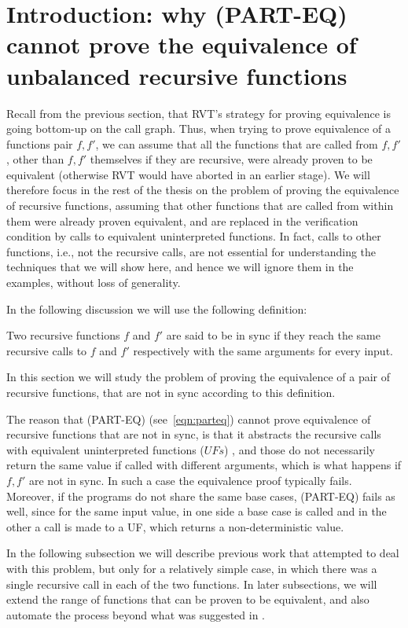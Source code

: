 \newcommand\os[1]{\textcolor{blue}{[os: #1]}}
\newcommand\crjs[1]{\textcolor{purple}{[CRJS: #1]}}
\section{Introduction: why (PART-EQ) cannot prove the equivalence of unbalanced recursive functions}
Recall from the previous section, that RVT's strategy for proving equivalence is going bottom-up on the call graph. Thus, when trying to prove equivalence of a functions pair $f,f'$, we can assume that all the functions that are called from $f,f'$, other than $f,f'$ themselves if they are recursive, were already proven to be equivalent (otherwise RVT would have aborted in an earlier stage). We will therefore focus in the rest of the thesis on the problem of proving the equivalence of recursive functions, assuming that other functions that are called from within them were already proven equivalent, and are replaced in the verification condition by calls to equivalent uninterpreted functions. In fact, calls to other functions, i.e., not the recursive calls, are not essential for understanding the techniques that we will show here, and hence we will ignore them in the examples, without loss of generality. 

In the following discussion we will use the following definition:
\begin{definition}[Sync]
Two recursive functions $f$ and $f'$ are said to be in sync if they reach the same recursive calls to $f$ and $f'$ respectively with the same arguments for every input.
\end{definition}
In this section we will study the problem of proving the equivalence of a pair of recursive functions, that are not in sync according to this definition. 


The reason that (PART-EQ) (see~\ref{eqn:parteq}) cannot prove equivalence of recursive functions that are not in sync, is that it abstracts the recursive calls with equivalent uninterpreted functions ($UFs$) \cite{DBLP:conf/dac/GodlinS09}, and those do not necessarily return the same value if called with different arguments, which is what happens if $f,f'$ are not in sync. In such a case the equivalence proof typically fails.
Moreover, if the programs do not share the same base cases, (PART-EQ) fails as well, since for the same input value, in one side a base case is called and in the other a call is made to a UF, which returns a non-deterministic value.

In the following subsection we will describe previous work\cite{DBLP:conf/fm/StrichmanV16} that attempted to deal with this problem, but only for a relatively simple case, in which there was a single recursive call in each of the two functions. In later subsections, we will extend the range of functions that can be proven to be equivalent, and also automate the process beyond what was suggested in \cite{DBLP:conf/fm/StrichmanV16}.

